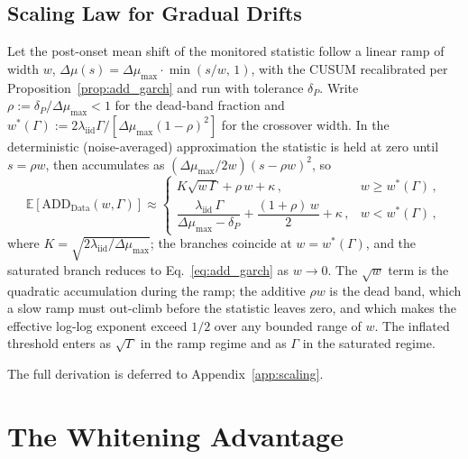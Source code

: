 \documentclass[sigconf,anonymous,review]{acmart}
\theoremstyle{acmdefinition}
\begin{document}
\subsection{Scaling Law for Gradual Drifts}

\begin{theorem}\label{thm:scaling}
    Let the post-onset mean shift of the monitored statistic follow a linear ramp of width $w$, $\Delta\mu(s) = \Delta\mu_{\max} \cdot \min(s/w,\, 1)$, with the CUSUM recalibrated per Proposition~\ref{prop:add_garch} and run with tolerance $\delta_P$.
    Write $\rho := \delta_P/\Delta\mu_{\max} < 1$ for the dead-band fraction and $w^*(\Gamma) := 2\lambda_{\mathrm{iid}}\Gamma / [\Delta\mu_{\max}(1-\rho)^2]$ for the crossover width.
    In the deterministic (noise-averaged) approximation the statistic is held at zero until $s = \rho w$, then accumulates as $(\Delta\mu_{\max}/2w)(s-\rho w)^2$, so
    \begin{equation}\label{eq:scaling}
        \mathbb{E}[\mathrm{ADD}_{\mathrm{Data}}(w, \Gamma)] \approx
        \begin{cases}
            K \sqrt{w \, \Gamma} + \rho\,w + \kappa\,,                                                             & w \ge w^*(\Gamma)\,, \\[4pt]
            \dfrac{\lambda_{\mathrm{iid}}\,\Gamma}{\Delta\mu_{\max}-\delta_P} + \dfrac{(1+\rho)\,w}{2} + \kappa\,, & w < w^*(\Gamma)\,,
        \end{cases}
    \end{equation}
    where $K = \sqrt{2\lambda_{\mathrm{iid}} / \Delta\mu_{\max}}$; the branches coincide at $w = w^*(\Gamma)$, and the saturated branch reduces to Eq.~\eqref{eq:add_garch} as $w \to 0$.
    The $\sqrt{w}$ term is the quadratic accumulation during the ramp; the additive $\rho w$ is the dead band, which a slow ramp must out-climb before the statistic leaves zero, and which makes the effective log-log exponent exceed $1/2$ over any bounded range of $w$. The inflated threshold enters as $\sqrt{\Gamma}$ in the ramp regime and as $\Gamma$ in the saturated regime.
\end{theorem}

\noindent The full derivation is deferred to Appendix~\ref{app:scaling}.

\section{The Whitening Advantage}\label{sec:whitening}
\end{document}
